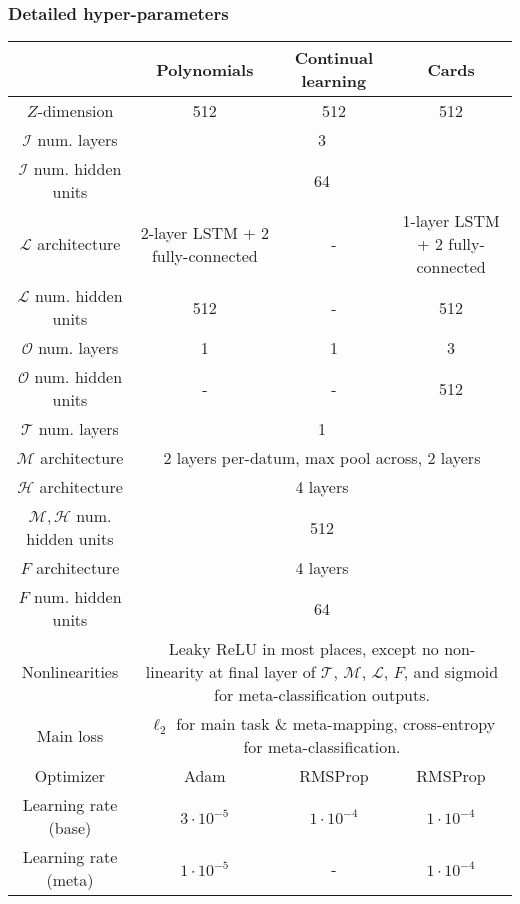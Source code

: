 \documentclass{article}
\begin{document}
\subsubsection{Detailed hyper-parameters}
\begin{table}
\centering
\begin{tabular}{|c||c|c|c|}
\hline 
& \phantom{bla}Polynomials\phantom{la} & Continual learning & \phantom{blahb}Cards\phantom{blahb} \\\hline
\hline
$Z$-dimension & 512 & 512 & 512 \\\hline
$\mathcal{I}$ num. layers & \multicolumn{3}{c|}{3} \\\hline 
$\mathcal{I}$ num. hidden units & \multicolumn{3}{c|}{64} \\\hline 
$\mathcal{L}$ architecture & \multicolumn{1}{p{2.5cm}|}{2-layer LSTM + 2 fully-connected} & - & \multicolumn{1}{p{2.5cm}|}{1-layer LSTM + 2 fully-connected} \\\hline 
$\mathcal{L}$ num. hidden units & 512 & - & 512 \\\hline 
$\mathcal{O}$ num. layers & 1 & 1 & 3 \\\hline 
$\mathcal{O}$ num. hidden units & - & - & 512 \\\hline 
$\mathcal{T}$ num. layers & \multicolumn{3}{c|}{1} \\\hline 
$\mathcal{M}$ architecture & \multicolumn{3}{c|}{2 layers per-datum, max pool across, 2 layers} \\\hline 
$\mathcal{H}$ architecture & \multicolumn{3}{c|}{4 layers} \\\hline 
$\mathcal{M}, \mathcal{H}$ num. hidden units & \multicolumn{3}{c|}{512} \\\hline 
$F$ architecture & \multicolumn{3}{c|}{4 layers} \\\hline 
$F$ num. hidden units & \multicolumn{3}{c|}{64} \\\hline 
Nonlinearities & \multicolumn{3}{p{8.5cm}|}{Leaky ReLU in most places, except no non-linearity at final layer of $\mathcal{T}$, $\mathcal{M}$, $\mathcal{L}$, $F$, and sigmoid for meta-classification outputs.} \\\hline
Main loss & \multicolumn{3}{p{8.5cm}|}{$\ell_2$ for main task \& meta-mapping, cross-entropy for meta-classification.}\\\hline
\hline
Optimizer & Adam & RMSProp & RMSProp \\\hline
Learning rate (base) & $3\cdot 10^{-5}$ & $1\cdot 10^{-4}$ & $1\cdot 10^{-4}$\\\hline
Learning rate (meta) & $1\cdot 10^{-5}$ & - & $1\cdot 10^{-4}$\\\hline

\end{tabular}
\end{table}
\end{document}
